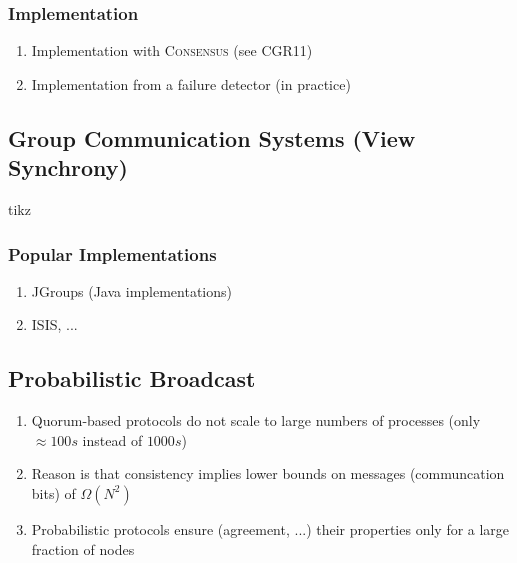 \documentclass{article}
\begin{document}
\begin{adjustwidth}{2em}{2em}
\begin{adjustwidth}{2em}{2em}
\begin{adjustwidth}{2em}{}
\begin{enumerate}[-]
\begin{enumerate}[\textbullet]
					\end{enumerate}
				\end{enumerate}
			\end{adjustwidth}
			\subsubsection{Implementation}
			\begin{adjustwidth}{2em}{}
				\begin{enumerate}[1)]
					\item Implementation with \textsc{Consensus} (see CGR11)
					\item Implementation from a failure detector (in practice)
				\end{enumerate}
			\end{adjustwidth}
		\end{adjustwidth}
		\subsection{Group Communication Systems (View Synchrony)}
		\begin{center}
			tikz
		\end{center}
		\begin{adjustwidth}{2em}{2em}
			\subsubsection{Popular Implementations}
			\begin{adjustwidth}{2em}{}
				\begin{enumerate}
					\item JGroups (Java implementations)
					\item ISIS, ...
				\end{enumerate}
			\end{adjustwidth}
		\end{adjustwidth}
		\subsection{Probabilistic Broadcast}
		\begin{adjustwidth}{2em}{2em}
			\begin{enumerate}
				\item Quorum-based protocols do not scale to large numbers of processes (only $\approx 100s$ instead of $1000s$)
				\item Reason is that consistency implies lower bounds on messages (communcation bits) of $\Omega(N^2)$
				\item Probabilistic protocols ensure (agreement, ...) their properties only for a large fraction of nodes
			\end{enumerate}

\end{adjustwidth}
\end{adjustwidth}
\end{document}
